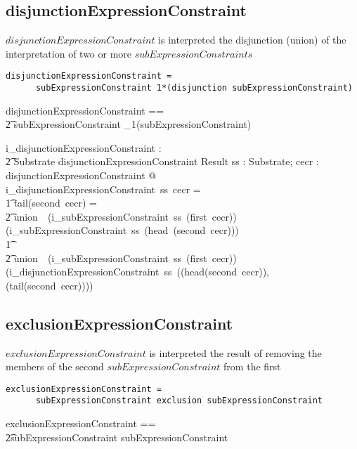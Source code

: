 \documentclass{article}
\begin{document}
\subsection{disjunctionExpressionConstraint}
$disjunctionExpressionConstraint$ is interpreted the disjunction (union) of the interpretation of two or more
$subExpressionConstraints$
\begin{verbatim}
disjunctionExpressionConstraint = 
      subExpressionConstraint 1*(disjunction subExpressionConstraint)
\end{verbatim}

\begin{zed}
disjunctionExpressionConstraint == \\
\t2 subExpressionConstraint \cross \seq_1(subExpressionConstraint)
\end{zed}

\begin{gendef}
    i\_disjunctionExpressionConstraint : \\
\t2 Substrate \pfun disjunctionExpressionConstraint \pfun Result
\where
   \forall ss : Substrate;  cecr : disjunctionExpressionConstraint @ \\
i\_disjunctionExpressionConstraint~ss~cecr = \\
\t1 \IF tail(second~cecr) = \langle \rangle \THEN \\
\t2 union~~(i\_subExpressionConstraint~ss~(first~cecr)) (i\_subExpressionConstraint~ss~(head~(second~cecr))) \\
\t1 \ELSE \\
\t2 union~~(i\_subExpressionConstraint~ss~(first~cecr)) (i\_disjunctionExpressionConstraint~ss~((head(second~cecr)), (tail(second~cecr))))
\end{gendef}

\subsection{exclusionExpressionConstraint}
$exclusionExpressionConstraint$ is interpreted the result of removing the members of the second
$subExpressionConstraint$ from the first
\begin{verbatim}
exclusionExpressionConstraint = 
      subExpressionConstraint exclusion subExpressionConstraint
\end{verbatim}

\begin{zed}
exclusionExpressionConstraint == \\ 
\t2subExpressionConstraint \cross subExpressionConstraint
\end{zed}
\end{document}
